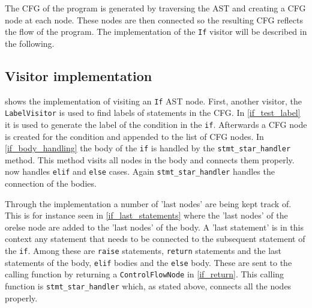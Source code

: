 The CFG of the program is generated by traversing the AST and creating a CFG node at each node.
These nodes are then connected so the resulting CFG reflects the flow of the program.
The implementation of the \texttt{If} visitor will be described in the following.

\subsection{Visitor implementation}
 shows the implementation of visiting an \texttt{If} AST node.
First, another visitor, the \texttt{LabelVisitor} is used to find labels of statements in the CFG.
In \cref{if_test_label} it is used to generate the label of the condition in the \texttt{if}.
Afterwards a CFG node is created for the condition and appended to the list of CFG nodes.
In \cref{if_body_handling} the body of the \texttt{if} is handled by the \texttt{stmt\_star\_handler} method.
This method visits all nodes in the body and connects them properly.
 now handles \texttt{elif} and \texttt{else} cases.
Again \texttt{stmt\_star\_handler} handles the connection of the bodies.

Through the implementation a number of 'last nodes' are being kept track of.
This is for instance seen in \cref{if_last_statements} where the 'last nodes' of the orelse node are added to the 'last nodes' of the body.
A 'last statement' is in this context any statement that needs to be connected to the subsequent statement of the \texttt{if}.
Among these are \texttt{raise} statements, \texttt{return} statements and the last statements of the body, \texttt{elif} bodies and the \texttt{else} body. 
These are sent to the calling function by returning a \texttt{ControlFlowNode} in \cref{if_return}.
This calling function is \texttt{stmt\_star\_handler} which, as stated above, connects all the nodes properly. 

